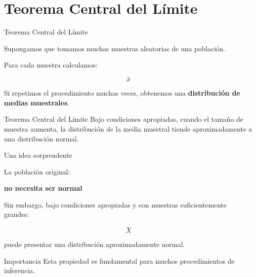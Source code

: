\documentclass[aspectratio=169,11pt]{beamer}
\begin{document}
\section{Teorema Central del Límite}

\begin{frame}{Teorema Central del Límite}

Supongamos que tomamos muchas muestras aleatorias de una población.

Para cada muestra calculamos:

\[
\bar{x}
\]

Si repetimos el procedimiento muchas veces, obtenemos una
\textbf{distribución de medias muestrales}.

\vspace{0.3cm}

\begin{block}{Teorema Central del Límite}
Bajo condiciones apropiadas, cuando el tamaño de muestra aumenta,
la distribución de la media muestral tiende aproximadamente a una distribución normal.
\end{block}

\end{frame}


\begin{frame}{Una idea sorprendente}

La población original:

\begin{center}

\Large
\textbf{no necesita ser normal}

\end{center}

\vspace{0.5cm}

Sin embargo, bajo condiciones apropiadas y con muestras suficientemente grandes:

\[
\bar{X}
\]

puede presentar una distribución aproximadamente normal.

\vspace{0.3cm}

\begin{alertblock}{Importancia}
Esta propiedad es fundamental para muchos procedimientos de inferencia.
\end{alertblock}

\end{frame}
\end{document}
